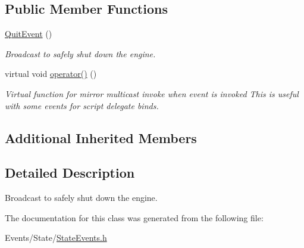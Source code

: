 \subsection*{Public Member Functions}
\begin{DoxyCompactItemize}
\item 
\mbox{\label{classQuitEvent_acde25804dff366bbade69c20597ebe32}} 
\hyperlink{classQuitEvent_acde25804dff366bbade69c20597ebe32}{Quit\+Event} ()
\begin{DoxyCompactList}\small\item\em Broadcast to safely shut down the engine. \end{DoxyCompactList}\item 
\mbox{\label{classQuitEvent_aaebf30a10ad87cc37513d3e819db8eeb}} 
virtual void \hyperlink{classQuitEvent_aaebf30a10ad87cc37513d3e819db8eeb}{operator()} ()
\begin{DoxyCompactList}\small\item\em Virtual function for mirror multicast invoke when event is invoked This is useful with some events for script delegate binds. \end{DoxyCompactList}\end{DoxyCompactItemize}
\subsection*{Additional Inherited Members}


\subsection{Detailed Description}
Broadcast to safely shut down the engine. 

The documentation for this class was generated from the following file\+:\begin{DoxyCompactItemize}
\item 
Events/\+State/\hyperlink{StateEvents_8h}{State\+Events.\+h}\end{DoxyCompactItemize}
